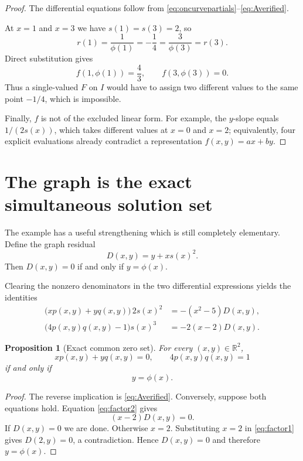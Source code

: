 \documentclass[11pt]{article}
\newtheorem{proposition}[theorem]{Proposition}
\theoremstyle{remark}
\begin{document}
\begin{proof}
The differential equations follow from \eqref{eq:oncurvepartials}--\eqref{eq:Averified}.

At $x=1$ and $x=3$ we have $s(1)=s(3)=2$, so
\begin{equation}\label{eq:collision}
 r(1)=\frac1{\phi(1)}=-\frac14
 =\frac3{\phi(3)}=r(3).
\end{equation}
Direct substitution gives
\begin{equation}\label{eq:values}
 f(1,\phi(1))=\frac43,
 \qquad
 f(3,\phi(3))=0.
\end{equation}
Thus a single-valued $F$ on $I$ would have to assign two different values to the same point $-1/4$, which is impossible.

Finally, $f$ is not of the excluded linear form.  For example, the $y$-slope equals $1/(2s(x))$, which takes different values at $x=0$ and $x=2$; equivalently, four explicit evaluations already contradict a representation $f(x,y)=ax+by$.
\end{proof}

\section{The graph is the exact simultaneous solution set}

The example has a useful strengthening which is still completely elementary.  Define the graph residual
\begin{equation}\label{eq:D}
 D(x,y)=y+x s(x)^2.
\end{equation}
Then $D(x,y)=0$ if and only if $y=\phi(x)$.

Clearing the nonzero denominators in the two differential expressions yields the identities
\begin{align}
 \bigl(xp(x,y)+yq(x,y)\bigr)\,2s(x)^2
   &=-(x^2-5)D(x,y),\label{eq:factor1}\\
 \bigl(4p(x,y)q(x,y)-1\bigr)s(x)^3
   &=-2(x-2)D(x,y).\label{eq:factor2}
\end{align}

\begin{proposition}[Exact common zero set]\label{prop:zero-set}
For every $(x,y)\in\mathbb R^2$,
\[
 xp(x,y)+yq(x,y)=0,
 \qquad
 4p(x,y)q(x,y)=1
\]
if and only if
\[
 y=\phi(x).
\]
\end{proposition}

\begin{proof}
The reverse implication is \eqref{eq:Averified}.  Conversely, suppose both equations hold.  Equation \eqref{eq:factor2} gives
\[
 (x-2)D(x,y)=0.
\]
If $D(x,y)=0$ we are done.  Otherwise $x=2$.  Substituting $x=2$ in \eqref{eq:factor1} gives $D(2,y)=0$, a contradiction.  Hence $D(x,y)=0$ and therefore $y=\phi(x)$.
\end{proof}
\end{document}
